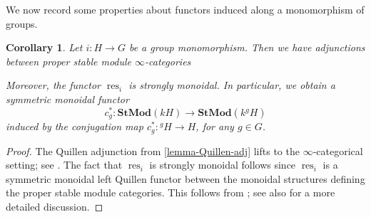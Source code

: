 \documentclass{amsart}
\newcommand{\res}{\operatorname{res}\nolimits}
\newcommand{\ind}{\operatorname{ind}\nolimits}
\def \Fin{{\mathcal{F}\textrm{in}}}
\def \Wfin{{\mathcal W}_{G}}
\DeclareMathOperator{\Mod}{Mod}
\numberwithin{equation}{section}%
\newtheorem{proposition}[equation]{Proposition}
\newtheorem{corollary}[equation]{Corollary}
\theoremstyle{remark}
\begin{document}
{We now record some properties about functors induced along a monomorphism of groups. 




\begin{corollary}\label{coro-functors-propstable}
    Let $i\colon H\to  G$ be a group monomorphism. Then we have  adjunctions between proper stable module $\infty$-categories 
    \begin{center}
    \end{center}
    Moreover, the functor  $\res_i$ is strongly monoidal. In particular, we obtain a symmetric monoidal functor 
    \[
    c^\ast_g\colon \mathbf{StMod}(kH)\to \mathbf{StMod}(k{}^g\!H)
    \]
    induced by the conjugation map $c_g^\ast\colon {{}^g\!H}\to H$, for any $g\in G$. 
\end{corollary}

\begin{proof}
    The Quillen adjunction from \cref{lemma-Quillen-adj} lifts to the $\infty$-categorical setting; see \cite{Maz16}. The fact that $\res_i$ is strongly monoidal follows since $\res_i$ is a symmetric monoidal left Quillen functor between the monoidal structures defining the proper stable module categories. This follows from \cite[Example 4.1.7.6]{Lur17}; see also \cite{NS17} for a more detailed discussion. 
\end{proof}


}
\end{document}
